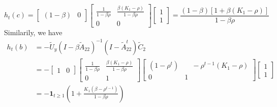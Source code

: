 \documentclass[11pt]{article}
\theoremstyle{definition}
\theoremstyle{boldtitle} %
\numberwithin{equation}{section}
\numberwithin{figure}{section}
\numberwithin{table}{section}
\begin{document}
\[
h_t(c) = \begin{bmatrix} (1 - \beta) & 0 \end{bmatrix}  
         \begin{bmatrix} \frac{1}{1 - \beta \rho} & \frac{\beta (K_1 - \rho)}{1 - \beta \rho} \\ 0 & 0 \end{bmatrix} 
         \begin{bmatrix} 1 \\ 1 \end{bmatrix}
        = \frac{(1 - \beta) \left[1 + \beta (K_1 - \rho)\right]}{1 - \beta \rho}
\]
Similarily, we have 
\begin{align*}
h_t(b) & = - \tilde{U}_y \left(I - \beta \tilde{A}_{22} \right)^{-1} \left( I - \tilde{A}_{22}^t \right) \tilde{C}_2 \\ 
    & = - \begin{bmatrix} 1 & 0 \end{bmatrix} 
    \begin{bmatrix} \frac{1}{1 - \beta \rho} & \frac{\beta (K_1 - \rho)}{1 - \beta \rho} \\ 0 & 1 \end{bmatrix} 
    \begin{bmatrix} (1 - \rho^t) & \quad - \rho^{t-1} (K_1 - \rho) \\ 0 & 1 \end{bmatrix} 
    \begin{bmatrix} 1 \\ 1 \end{bmatrix} \\ 
    & = - \bm{1}_{t \geq 1} \left(1 + \frac{K_1 \left( \beta - \rho^{t-1} \right)}{1 - \beta \rho} \right)
\end{align*}





\end{document}
